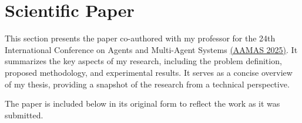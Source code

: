 \section{Scientific Paper}

\begin{flushleft}
    This section presents the paper co-authored with my professor for the 24th International Conference on Agents and Multi-Agent Systems \href{https://aamas2025.org/}{(AAMAS 2025)}. It summarizes the key aspects of my research, including the problem definition, proposed methodology, and experimental results. It serves as a concise overview of my thesis, providing a snapshot of the research from a technical perspective.
\end{flushleft}

\begin{flushleft}
    The paper is included below in its original form to reflect the work as it was submitted.
\end{flushleft}

\newpage

{}


{}

{}

{}



{}



{}

{}



{}


